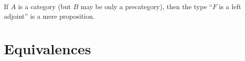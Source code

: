 \documentclass[hott-all.tex]{subfiles}
\begin{document}
\begin{lem}\label{ct:adjprop}
  If $A$ is a category (but $B$ may be only a precategory), then the type ``$F$ is a left adjoint'' is a mere proposition.
\end{lem}
%



\section{Equivalences}
\label{sec:equivalences}

\end{document}
